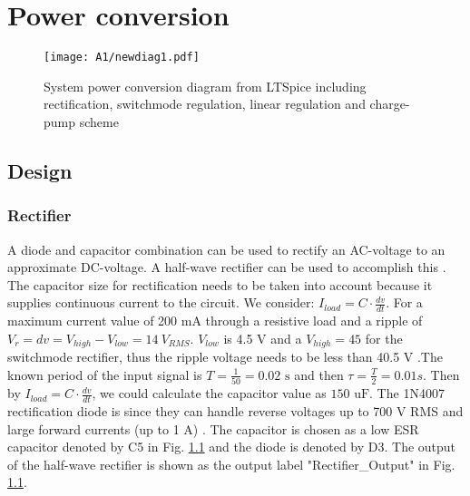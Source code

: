 \chapter{Power conversion}\label{ch:power_conversion}
\vspace{-2cm}

\begin{figure}[H]
    \centering
    \texttt{[image: A1/newdiag1.pdf]}
    \caption{System power conversion diagram from LTSpice including rectification, switchmode regulation, linear regulation and charge-pump scheme}
    \label{fig:all_power}
\end{figure}

\vspace{-1cm}

\section{Design} \label{sec:design_rectifier}

\subsection{Rectifier}

A diode and capacitor combination can be used to rectify an AC-voltage to an approximate DC-voltage. A half-wave rectifier can be used to accomplish this \cite{half-wave}. The capacitor size for rectification needs to be taken into account because it supplies continuous current to the circuit. We consider: $I_{load}  = C \cdot \frac{dv}{dt}$. For a maximum current value of 200 mA through a resistive load and a ripple of $V_r = dv = V_{high} - V_{low} =\SI{14}{V_{RMS}} $. $V_{low}$ is 4.5 V and a $V_{high} = 45$ for the switchmode rectifier, thus the ripple voltage needs to be less than 40.5 V \cite{TI:LM2595}.The known period of the input signal is $T = \frac{1}{50} = 0.02 \text{ s}$ and then $\tau = \frac{T}{2} = 0.01 s$. Then by $I_{load}  = C \cdot \frac{dv}{dt}$, we could calculate the capacitor value as $150 \text{ uF}$. The 1N4007 rectification diode is since they can handle reverse voltages up to 700 V RMS and large forward currents (up to 1 A) \cite{1N4007}. The capacitor is chosen as a low ESR capacitor denoted by C5 in Fig. \ref{fig:all_power} and the diode is denoted by D3. The output of the half-wave rectifier is shown as the output label "Rectifier\_Output" in Fig. \ref{fig:all_power}.

